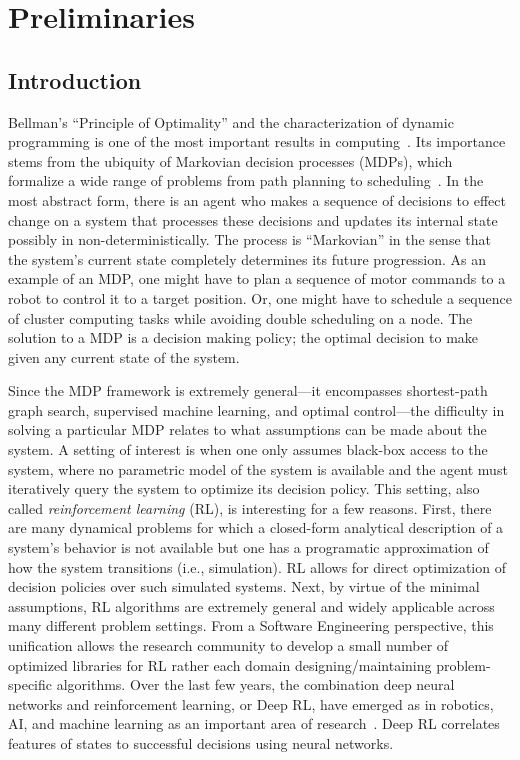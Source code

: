 \setcounter{secnumdepth}{0}
\chapter{Preliminaries}
\section{Introduction}
Bellman's ``Principle of Optimality'' and the characterization of dynamic programming is one of the most important results in computing~\cite{bellman2013dynamic}. Its importance stems from the ubiquity of Markovian decision processes (MDPs), which formalize a wide range of problems from path planning to scheduling~\cite{howard1966dynamic}. In the most abstract form, there is an agent who makes a sequence of decisions to effect change on a system that processes these decisions and updates its internal state possibly in non-deterministically. 
The process is ``Markovian'' in the sense that the system's current state completely determines its future progression. As an example of an MDP, one might have to plan a sequence of motor commands to a robot to control it to a target position. Or, one might have to schedule a sequence of cluster computing tasks while avoiding double scheduling on a node. 
The solution to a MDP is a decision making policy; the optimal decision to make given any current state of the system. 

Since the MDP framework is extremely general---it encompasses shortest-path graph search, supervised machine learning, and optimal control---the difficulty in solving a particular MDP relates to what assumptions can be made about the system.
A setting of interest is when one only assumes black-box access to the system, where no parametric model of the system is available and the agent must iteratively query the system to optimize its decision policy.
This setting, also called \emph{reinforcement learning} (RL), is interesting for a few reasons.
First, there are many dynamical problems for which a closed-form analytical description of a system's behavior is not available but one has a programatic approximation of how the system transitions (i.e., simulation).
RL allows for direct optimization of decision policies over such simulated systems.
Next, by virtue of the minimal assumptions, RL algorithms are extremely general and widely applicable across many different problem settings.
From a Software Engineering perspective, this unification allows the research community to develop a small number of optimized libraries for RL rather each domain designing/maintaining problem-specific algorithms.
Over the last few years, the combination deep neural networks and reinforcement learning, or Deep RL, have emerged as in robotics, AI, and machine learning as an important area of research~\cite{mnih2015human,silver2017mastering, sunderhauf2018limits, stoica2017berkeley}.
Deep RL correlates features of states to successful decisions using neural networks. 

